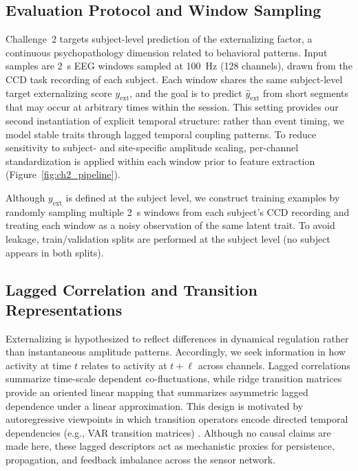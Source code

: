 \documentclass[12pt]{article}
\begin{document}
\subsection{Evaluation Protocol and Window Sampling}

Challenge~2 targets subject-level prediction of the externalizing factor, a continuous psychopathology dimension related
to behavioral patterns. Input samples are 2~s EEG windows sampled at 100~Hz (128 channels), drawn from the CCD task recording of each subject. Each window shares the same subject-level target externalizing score $y_{\mathrm{ext}}$,
and the goal is to predict $\hat y_{\mathrm{ext}}$ from short segments that may occur at arbitrary times within the
session. This setting provides our second instantiation of explicit temporal structure: rather than event timing, we
model stable traits through lagged temporal coupling patterns. To reduce sensitivity to subject- and site-specific
amplitude scaling, per-channel standardization is applied within each window prior to feature extraction
(Figure~\ref{fig:ch2_pipeline}).

Although $y_{\mathrm{ext}}$ is defined at the subject level, we construct training examples by randomly sampling multiple
2~s windows from each subject's CCD recording and treating each window as a noisy observation of the same latent trait.
To avoid leakage, train/validation splits are performed at the subject level (no subject appears in both splits).

\subsection{Lagged Correlation and Transition Representations}
\label{sec:ch2_features}

Externalizing is hypothesized to reflect differences in dynamical regulation rather than instantaneous amplitude
patterns. Accordingly, we seek information in how activity at time $t$ relates to activity at $t+\ell$ across channels.
Lagged correlations summarize time-scale dependent co-fluctuations, while ridge transition matrices provide an oriented
linear mapping that summarizes asymmetric lagged dependence under a linear approximation. This design is motivated by
autoregressive viewpoints in which transition operators encode directed temporal dependencies (e.g., VAR transition
matrices) \citep{geiger2015_causalinf}. Although no causal claims are made here, these lagged descriptors act as
mechanistic proxies for persistence, propagation, and feedback imbalance across the sensor network.
\end{document}
